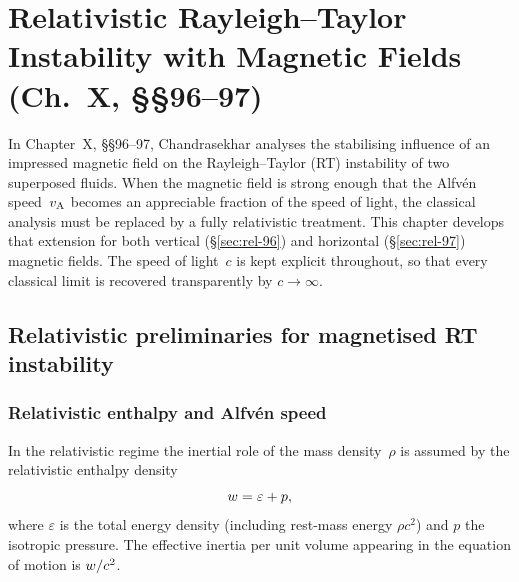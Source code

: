 %

\chapter{Relativistic Rayleigh--Taylor Instability with Magnetic Fields
  (Ch.~X, \S\S96--97)}\label{ch:rel-10-96-97}

In Chapter~X, \S\S96--97, Chandrasekhar analyses the stabilising
influence of an impressed magnetic field on the Rayleigh--Taylor (RT)
instability of two superposed fluids.  When the magnetic field is strong
enough that the Alfv\'en speed~$v_{\mathrm{A}}$ becomes an appreciable fraction of
the speed of light, the classical analysis must be replaced by a fully
relativistic treatment.  This chapter develops that extension for both
vertical (\S\ref{sec:rel-96}) and horizontal
(\S\ref{sec:rel-97}) magnetic fields.  The speed of light~$c$ is kept
explicit throughout, so that every classical limit is recovered
transparently by $c\to\infty$.

\section{Relativistic preliminaries for magnetised RT
  instability}\label{sec:rel-96-prelim}

\subsection{Relativistic enthalpy and Alfv\'en speed}

In the relativistic regime the inertial role of the mass density~$\rho$
is assumed by the relativistic enthalpy density
\begin{equation}
  w = \varepsilon + p,
  \label{eq:rel96-enthalpy}
\end{equation}
where $\varepsilon$ is the total energy density (including rest-mass
energy $\rho c^{2}$) and $p$ the isotropic pressure.  The effective
inertia per unit volume appearing in the equation of motion is
$w/c^{2}$.

